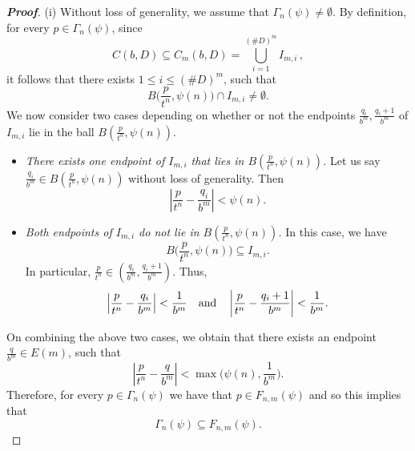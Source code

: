 \documentclass[12pt]{article}
\theoremstyle{definition}
\theoremstyle{remark}
\begin{document}
\begin{proof}[\rm \textbf{Proof}] (i) Without loss of generality, we assume that $\Gamma_{n}(\psi)\neq\emptyset$. By definition, for every $p\in\Gamma_{n}(\psi)$, since $$C(b,D)\subseteq C_{m}(b,D)=\bigcup_{i=1}^{(\#D)^{m}}I_{m,i}  \, , $$ it follows that there exists $1\leq i\leq (\#D)^{m}$, such that 
$$ B\big(\textstyle{\frac{p}{t^{n}},\psi(n)}\big)\cap I_{m,i}\neq\emptyset.$$
We now consider two cases depending on  whether or not the endpoints $ \frac{q_{i}}{b^{m}},\frac{q_{i}+1}{b^{m}} $   of $I_{m,i}$ lie  in the ball $ B\left(\frac{p}{t^{n}},\psi(n)\right)$. 
\begin{itemize}
    \item {\em  There exists  one endpoint of $I_{m,i}$ that lies in 
$B\left(\frac{p}{t^{n}},\psi(n)\right)$.} Let us say $\frac{q_{i}}{b^{m}}\in B\left(\frac{p}{t^{n}},\psi(n)\right)$ without loss of generality. Then
$$\left|\frac{p}{t^{n}}-\frac{q_{i}}{b^{m}}\right|<\psi(n).$$
    \item {\em   Both endpoints of $I_{m,i}$ do not lie in $B\left(\frac{p}{t^{n}},\psi(n)\right)$.} In this case, we have 
$$B\big(\textstyle{\frac{p}{t^{n}},\psi(n)}\big) \subseteq I_{m,i}.$$
In particular, $\frac{p}{t^{n}}\in\left(\frac{q_{i}}{b^{m}},\frac{q_{i}+1}{b^{m}}\right)$. Thus,
$$\left|\frac{p}{t^{n}}-\frac{q_{i}}{b^{m}}\right|<\frac{1}{b^{m}}\quad {\rm and}\quad \left|\frac{p}{t^{n}}-\frac{q_{i}+1}{b^{m}}\right|<\frac{1}{b^{m}}.$$
\end{itemize}


\noindent On combining the above two cases, we obtain that there exists an endpoint $\frac{q}{b^{m}}\in E(m)$, such that $$\left|\frac{p}{t^{n}}-\frac{q}{b^{m}}\right|<\max\Big(\psi(n) ,\frac{1}{b^{m}}\Big).$$
Therefore, for every $p\in\Gamma_{n}(\psi)$ we have that  $p\in F_{n,m}(\psi)$ and so  this implies that 
$$\Gamma_{n}(\psi)\subseteq F_{n,m}(\psi).$$



\end{proof}
\end{document}
